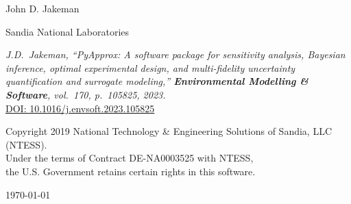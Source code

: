 \begin{titlepage}
{\Large\sffamily John D. Jakeman\par}
\vspace{0.3cm}
{\large Sandia National Laboratories\par}

\vspace{1cm}

\begin{minipage}{0.85\textwidth}
\small
\textit{J.D.\ Jakeman, ``PyApprox: A software package for sensitivity analysis,
Bayesian inference, optimal experimental design, and multi-fidelity uncertainty
quantification and surrogate modeling,''
\textbf{Environmental Modelling \& Software}, vol.~170, p.~105825, 2023.}\\[4pt]
\href{https://doi.org/10.1016/j.envsoft.2023.105825}{DOI: 10.1016/j.envsoft.2023.105825}
\end{minipage}

\vfill

\small Copyright 2019 National Technology \& Engineering Solutions of Sandia, LLC (NTESS).\\
Under the terms of Contract DE-NA0003525 with NTESS,\\
the U.S. Government retains certain rights in this software.

\vspace{0.3cm}

{\small\today}

\restoregeometry
\end{titlepage}
